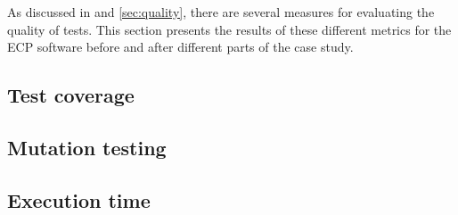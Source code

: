 
As discussed in  and \ref{sec:quality}, there are
several measures for evaluating the quality of tests. This section
presents the results of these different metrics for the ECP software
before and after different parts of the case study.\\


\subsection{Test coverage}
    

\subsection{Mutation testing}
    

\subsection{Execution time}
    
